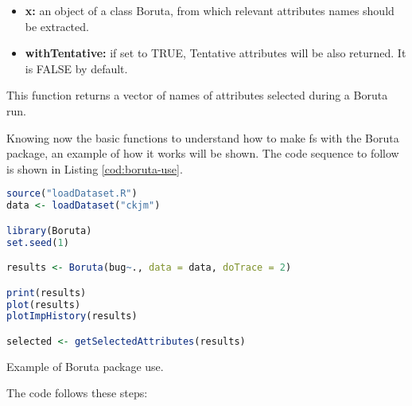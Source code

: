 \begin{itemize}
    \item \textbf{x:} an object of a class Boruta, from which relevant attributes names should be extracted.
    
    \item \textbf{withTentative:} if set to TRUE, Tentative attributes will be also returned. It is FALSE by default.
\end{itemize}

This function returns a vector of names of attributes selected during a Boruta run.

Knowing now the basic functions to understand how to make \acrshort{fs} with the Boruta package, an example of how it works will be shown. The code sequence to follow is shown in Listing \ref{cod:boruta-use}.

\begin{codefloat}[H]
\begin{lstlisting}[language=R, style=Ccolor]
source("loadDataset.R")
data <- loadDataset("ckjm")

library(Boruta)
set.seed(1)

results <- Boruta(bug~., data = data, doTrace = 2)

print(results)
plot(results)
plotImpHistory(results)

selected <- getSelectedAttributes(results)
\end{lstlisting}
\caption{Example of Boruta package use.}
\label{cod:boruta-use}
\end{codefloat}

The code follows these steps:

